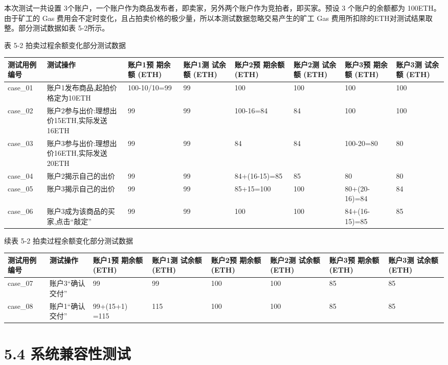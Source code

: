 \documentclass[
  10
]{article}
\newcounter{none} %
\begin{document}
本次测试一共设置
3个账户，一个账户作为商品发布者，即卖家，另外两个账户作为竞拍者，即买家。预设
3 个账户的余额都为 100ETH。由于矿工的 Gas
费用会不定时变化，且占拍卖价格的极少量，所以本测试数据忽略交易产生的旷工
Gas 费用所扣除的ETH对测试结果取整。部分测试数据如表 5-2所示。

表 5-2 拍卖过程余额变化部分测试数据

{\def\LTcaptype{none} %
\begin{longtable}[]{@{}|l|l|l|l|l|l|l|l|@{}}
\toprule\noalign{}
\endhead
\bottomrule\noalign{}
\endlastfoot
\hline
测试用例编号 & 测试操作 & 账户1预 期余额 (ETH) & 账户1测 试余额 (ETH) &
账户2预 期余额 (ETH) & 账户2测 试余额 (ETH) & 账户3预 期余额 (ETH) &
账户3测 试余额 (ETH) \\
\hline
case\_01 & 账户1发布商品,起拍价格定为10ETH & 100-10/10=99 & 99 & 100 &
100 & 100 & 100 \\
\hline
case\_02 & 账户2参与出价:理想出价15ETH,实际发送16ETH & 99 & 99 &
100-16=84 & 84 & 100 & 100 \\
\hline
case\_03 & 账户3参与出价:理想出价16ETH,实际发送20ETH & 99 & 99 & 84 & 84
& 100-20=80 & 80 \\
\hline
case\_04 & 账户2揭示自己的出价 & 99 & 99 & 84+(16-15)=85 & 85 & 80 &
80 \\
\hline
case\_05 & 账户3揭示自己的出价 & 99 & 99 & 85+15=100 & 100 &
80+(20-16)=84 & 84 \\
\hline
case\_06 & 账户3成为该商品的买家,点击``敲定'' & 99 & 99 & 100 & 100 &
84+(16-15)=85 & 85 \\
\hline
\end{longtable}
}

续表 5-2 拍卖过程余额变化部分测试数据

{\def\LTcaptype{none} %
\begin{longtable}[]{@{}|l|l|l|l|l|l|l|l|@{}}
\toprule\noalign{}
\endhead
\bottomrule\noalign{}
\endlastfoot
\hline
测试用例编号 & 测试操作 & 账户1预 期余额 (ETH) & 账户1测 试余额 (ETH) &
账户2预 期余额 (ETH) & 账户2测 试余额 (ETH) & 账户3预 期余额 (ETH) &
账户3测 试余额 (ETH) \\
\hline
case\_07 & 账户3``确认 交付'' & 99 & 99 & 100 & 100 & 85 & 85 \\
\hline
case\_08 & 账户1``确认 交付'' & 99+(15+1) =115 & 115 & 100 & 100 & 85 &
85 \\
\hline
\end{longtable}
}

\section{5.4
系统兼容性测试}\label{ux7cfbux7edfux517cux5bb9ux6027ux6d4bux8bd5}
\end{document}
